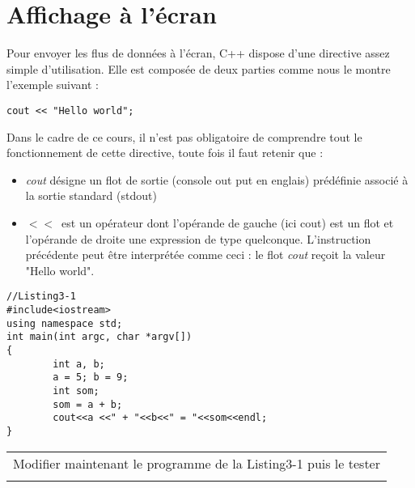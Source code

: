 \documentclass[a4paper, oneside,11pt]{book}
\begin{document}
\section{Affichage \`a l'\'ecran}

Pour envoyer les flus de donn\'ees \`a l'\'ecran, C++ dispose d'une directive assez simple d'utilisation. Elle est compos\'ee de deux parties comme nous le montre l'exemple suivant :

\begin{verbatim}
cout << "Hello world";
\end{verbatim}

Dans le cadre de ce cours, il n'est pas  obligatoire de comprendre tout le fonctionnement de cette directive, toute fois il faut retenir que :

\begin{itemize}
\item \textit{cout} d\'esigne un flot de sortie (console out put en englais) pr\'ed\'efinie associ\'e \`a la sortie standard (stdout)
\item $<<$\ est un op\'erateur dont l'op\'erande de gauche (ici cout) est un flot et l'op\'erande de droite une expression de type quelconque. L'instruction pr\'ec\'edente peut \^etre 
interpr\'et\'ee comme ceci : le flot \textit{cout} re\c{c}oit la valeur "Hello world".
\end{itemize}
\begin{lstlisting}
//Listing3-1
#include<iostream>
using namespace std;
int main(int argc, char *argv[])
{
        int a, b;
        a = 5; b = 9;
        int som;
        som = a + b;
        cout<<a <<" + "<<b<<" = "<<som<<endl;
} 
\end{lstlisting}


 \begin{table}[hhhh]
 \begin{tabular}{l}
Modifier maintenant le programme de la Listing3-1 puis le tester\\
 \\
 \end{tabular}
 \end{table}


\end{document}
